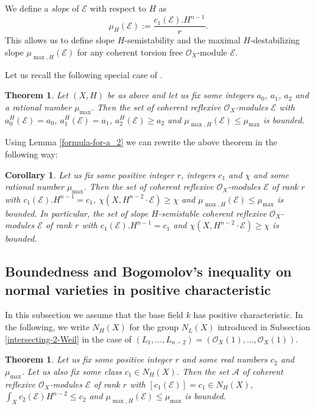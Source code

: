 \documentclass[twoside, 11pt]{article}
\theoremstyle{plain}
\newtheorem{Theorem}[Thm]{\sc Theorem}
\newtheorem{Corollary}[Thm]{\sc Corollary}
\theoremstyle{definition}
\theoremstyle{remark}
\newcommand{\cA}{{\mathcal A}}
\newcommand{\cE}{{\mathcal E}}
\newcommand{\cO}{{\mathcal O}}
\begin{document}
\medskip

We define a \emph{slope} of $\cE$ with respect to $H$ as
$$\mu _H(\cE) :=\frac{c_1(\cE).H^{n-1}}{r}.$$
This allows us to define slope $H$-semistability and the maximal $H$-destabilizing slope $\mu _{\max, H} (\cE)$ 
for any coherent torsion free  $\cO_X$-module $\cE$.

\medskip

Let us recall the following  special case of \cite[Theorem 4.4]{La1}.

\begin{Theorem} \label{boundedness-1}
Let $(X, H)$ be as above and let us fix some integers  $a_0$, $a_1$, $a_2$ and a rational number $\mu _{\max}$.
Then the set of coherent reflexive  $\cO_X$-modules $\cE$ with $a_0 ^H(\cE)=a_0$, $a_1^H (\cE)=a_1$,
$a_2 ^H(\cE)\ge a_2$ and $\mu _{\max ,H } (\cE)\le \mu _{\max}$ is bounded.
\end{Theorem}

Using Lemma \ref{formula-for-a_2} we can rewrite the above theorem in the following way:

\begin{Corollary}\label{boundedness-2}
Let  us fix some positive integer $r$, integers $c_1$ and $\chi$ and some rational 
number $\mu _{\max}$. Then the set of coherent reflexive $\cO_X$-modules $\cE$ of rank $r$ with
$c_1 (\cE). H^{n-1}=c_1$,  $\chi (X, H^{n-2}\cdot \cE )\ge \chi$ 
and $\mu _{\max, H} (\cE)\le \mu _{\max}$ is bounded. In particular, the set of slope $H$-semistable coherent reflexive  $\cO_X$-modules $\cE$ of rank $r$ with $c_1 (\cE). H^{n-1}=c_1$
and  $\chi (X, H^{n-2}\cdot \cE )\ge \chi$ 
is bounded.
\end{Corollary}






\medskip

\subsection{Boundedness and Bogomolov's inequality on normal varieties in positive characteristic}

In this subsection we assume that the base field $k$ has positive characteristic. 
In the following, we write $N_H(X)$ for the group
$N_L(X)$ introduced in Subsection \ref{intersecting-2-Weil} in the case of $(L_1,...,L_{n-2})=(\cO_X (1),...,\cO_X (1))$.

\begin{Theorem} \label{boundedness-3}
Let us fix some positive integer $r$  and some real
numbers $c_2$ and $\mu _{\max}$. Let us also fix some class $c_1\in N_H(X)$.
Then the set $\cA$ of coherent reflexive $\cO_X$-modules $\cE$ of rank $r$ with $[c_1(\cE)]=c_1\in N_H(X)$,
$\int _X c_2 (\cE) H^{n-2}\le c_2$  and $\mu _{\max ,H } (\cE)\le \mu _{\max}$
is bounded.
\end{Theorem}
\end{document}
